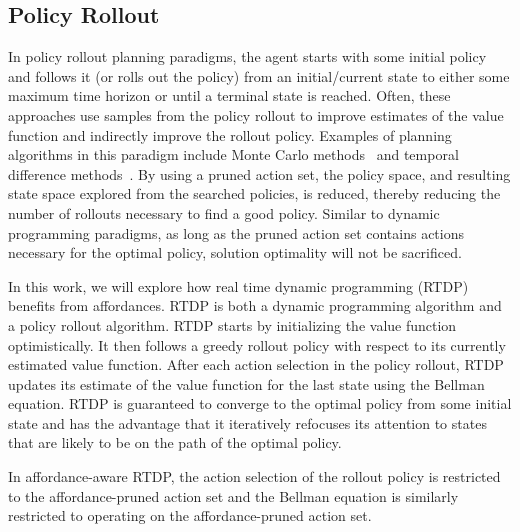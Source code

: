 \documentclass[]{article}
\begin{document}
\subsection{Policy Rollout}

In policy rollout planning paradigms, the agent starts with some
initial policy and follows it (or rolls out the policy) from an
initial/current state to either some maximum time horizon or until a
terminal state is reached. Often, these approaches use samples from
the policy rollout to improve estimates of the value function and
indirectly improve the rollout policy. Examples of planning algorithms
in this paradigm include Monte Carlo methods~\citep{browne12,
  silver10} and temporal difference
methods~\citep{sutton99,sutton1988lpm,rummery1994line,6313077,lagoudakis2003least,Peters:2008ve}.
By using a pruned
action set, the policy space, and resulting state space explored from
the searched policies, is reduced, thereby reducing the number of
rollouts necessary to find a good policy. Similar to dynamic
programming paradigms, as long as the pruned action set contains
actions necessary for the optimal policy, solution optimality will not
be sacrificed.

In this work, we will explore how real time dynamic programming
(RTDP)~\citep{barto95} benefits from affordances. RTDP is both a
dynamic programming algorithm and a policy rollout algorithm. RTDP
starts by initializing the value function optimistically. It then
follows a greedy rollout policy with respect to its currently estimated
value function. After each
action selection in the policy rollout, RTDP updates its estimate of
the value function for the last state using the Bellman equation. RTDP
is guaranteed to converge to the optimal policy from some initial
state and has the advantage that it iteratively refocuses its
attention to states that are likely to be on the path of the optimal
policy.

In affordance-aware RTDP, the action selection of the rollout policy
is restricted to the affordance-pruned action set and the Bellman
equation is similarly restricted to operating on the affordance-pruned
action set.



%
%
\end{document}
